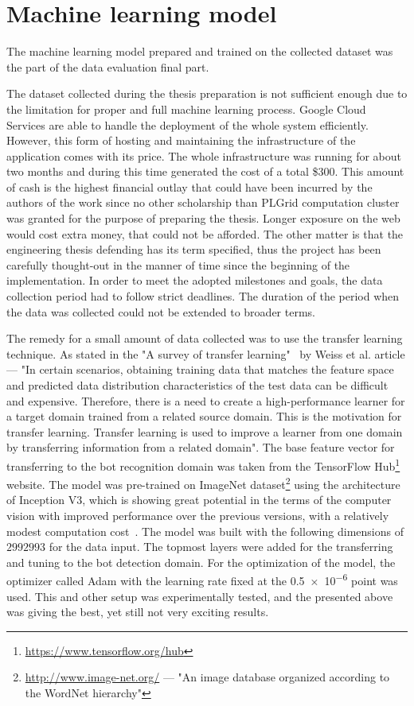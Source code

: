 \section{Machine learning model}\label{sec:machine-learning-model}
The machine learning model prepared and trained on the collected dataset was the part of the data evaluation final part.

The dataset collected during the thesis preparation is not sufficient enough due to the limitation for proper and full machine learning process.
Google Cloud Services are able to handle the deployment of the whole system efficiently.
However, this form of hosting and maintaining the infrastructure of the application comes with its price.
The whole infrastructure was running for about two months and during this time generated the cost of a total \$300.
This amount of cash is the highest financial outlay that could have been incurred by the authors of the work since no other scholarship than PLGrid computation cluster was granted for the purpose of preparing the thesis.
Longer exposure on the web would cost extra money, that could not be afforded.
The other matter is that the engineering thesis defending has its term specified, thus the project has been carefully thought-out in the manner of time since the beginning of the implementation.
In order to meet the adopted milestones and goals, the data collection period had to follow strict deadlines.
The duration of the period when the data was collected could not be extended to broader terms.

The remedy for a small amount of data collected was to use the transfer learning technique.
As stated in the "A survey of transfer learning"~\cite{transfer-learning-def} by Weiss et al. article --- "In certain scenarios, obtaining training data that matches the feature space and predicted data distribution characteristics of the test data can be difficult and expensive.
Therefore, there is a need to create a high-performance learner for a target domain trained from a related source domain.
This is the motivation for transfer learning.
Transfer learning is used to improve a learner from one domain by transferring information from a related domain".
The base feature vector for transferring to the bot recognition domain was taken from the TensorFlow Hub\footnote{\url{https://www.tensorflow.org/hub}} website.
The model was pre-trained on ImageNet dataset\footnote{\url{http://www.image-net.org/} --- "An image database organized according to the WordNet hierarchy"} using the architecture of Inception V3, which is showing great potential in the terms of the computer vision with improved performance over the previous versions, with a relatively modest computation cost~\cite{inception-v3}.
The model was built with the following dimensions of $299$\texttimes$299$\texttimes$3$ for the data input.
The topmost layers were added for the transferring and tuning to the bot detection domain.
For the optimization of the model, the optimizer called Adam with the learning rate fixed at the \num{0.5e-6} point was used.
This and other setup was experimentally tested, and the presented above was giving the best, yet still not very exciting results.
